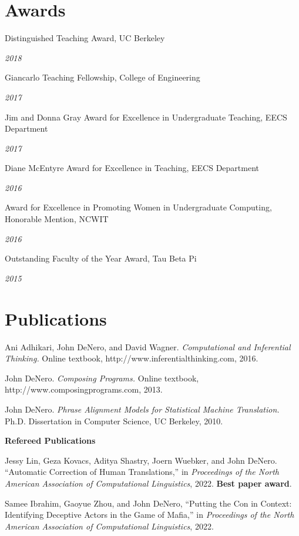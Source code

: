 \documentclass[margin,line]{res}
\newcommand{\dated}[2]{\parbox[t]{4.4in}{#1} \hspace{0.4in}
											 \parbox[t]{1in}{ {\it #2 } } }
\begin{document}
\begin{resume}
\section{\sc Awards}

\dated{Distinguished Teaching Award, UC Berkeley} { 2018 }

\dated{Giancarlo Teaching Fellowship, College of Engineering} { 2017 }

\dated{Jim and Donna Gray Award for Excellence in Undergraduate Teaching, EECS Department} { 2017 }

\dated{Diane McEntyre Award for Excellence in Teaching, EECS Department} { 2016 }

\dated{Award for Excellence in Promoting Women in Undergraduate Computing, Honorable Mention, NCWIT} { 2016 }

%
\dated{Outstanding Faculty of the Year Award, Tau Beta Pi} { 2015 }

%
%
%

\section{\sc Publications}

Ani Adhikari, John DeNero, and David Wagner. {\it Computational and
Inferential Thinking.} Online textbook, http://www.inferentialthinking.com,
2016.

John DeNero. {\it Composing Programs.} Online textbook,
http://www.composingprograms.com, 2013.

John DeNero. {\it Phrase Alignment Models for Statistical Machine Translation.}
Ph.D. Dissertation in Computer Science, UC Berkeley, 2010.

{\bf Refereed Publications }

Jessy Lin, Geza Kovacs, Aditya Shastry, Joern Wuebker, and John DeNero. ``Automatic Correction of Human Translations,'' in {\it Proceedings of the North American Association of Computational Linguistics}, 2022. \textbf{Best paper award}.

Samee Ibrahim, Gaoyue Zhou, and John DeNero, ``Putting the Con in Context: Identifying Deceptive Actors in the Game of Mafia,'' in {\it Proceedings of the North American Association of Computational Linguistics}, 2022.


\end{resume}
\end{document}
